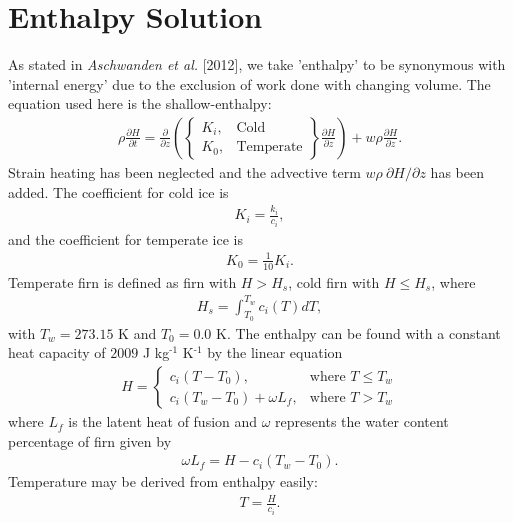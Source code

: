 \documentclass{article}%
\newcommand{\sups}[1]{\ensuremath{^{\textrm{#1}}}}
\begin{document}
\section{Enthalpy Solution}

As stated in \emph{Aschwanden et al.} [2012], we take 'enthalpy' to be synonymous with 'internal energy' due to the exclusion of work done with changing volume.  The equation used here is the shallow-enthalpy:
\begin{align*}
  \rho \frac{\partial H}{\partial t} = \frac{\partial}{\partial z} 
    \left( 
      \begin{Bmatrix}
        K_i, &\text{Cold}\\
        K_0, &\text{Temperate}
      \end{Bmatrix}
      \frac{\partial H}{\partial z} 
    \right) + w \rho \frac{\partial H}{\partial z}.
\end{align*}
Strain heating has been neglected and the advective term $w \rho\ \partial H / \partial z$ has been added.  The coefficient for cold ice is 
\begin{align*}
  K_i = \frac{k_i}{c_i},
\end{align*}
and the coefficient for temperate ice is
\begin{align*}
  K_0 = \frac{1}{10}K_i.
\end{align*}
Temperate firn is defined as firn with $H > H_s$, cold firn with $H \leq H_s$, where
\begin{align*}
  H_s = \int_{T_0}^{T_w}{c_i(T)}dT,
\end{align*}
with $T_w = 273.15$ K and $T_0 = 0.0$ K.  The enthalpy can be found with a constant heat capacity of $2009$ J kg\sups{-1} K\sups{-1} by the linear equation
\begin{align*}
  H = 
  \begin{cases}
    c_i(T - T_0), &\text{where } T \leq T_w\\
    c_i(T_w - T_0) + \omega L_f,  &\text{where } T > T_w
  \end{cases}
\end{align*}
where $L_f$ is the latent heat of fusion and $\omega$ represents the water content percentage of firn given by
\begin{align*}
  \omega L_f = H - c_i(T_w - T_0).
\end{align*}
Temperature may be derived from enthalpy easily:
\begin{align*}
  T = \frac{H}{c_i}.
\end{align*}
\end{document}
